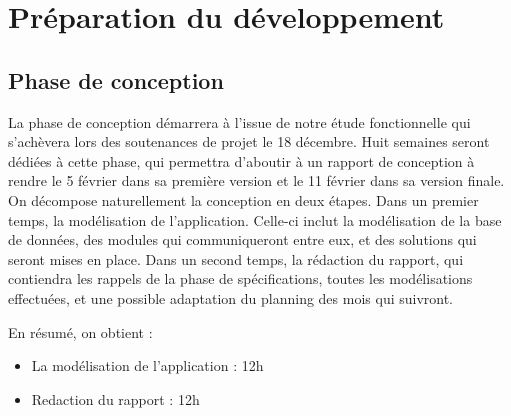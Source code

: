\section{Préparation du développement}
\label{sec:prep_dev}
    \subsection{Phase de conception}
    \label{subsec:conception}
        La phase de conception démarrera à l'issue de notre étude fonctionnelle qui s'achèvera lors des soutenances de projet le 18 décembre. Huit semaines seront dédiées à cette phase, qui permettra d'aboutir à un rapport de conception à rendre le 5 février dans sa première version et le 11 février dans sa version finale. On décompose naturellement la conception en deux étapes. Dans un premier temps, la modélisation de l'application. Celle-ci inclut la modélisation de la base de données, des modules qui communiqueront entre eux, et des solutions qui seront mises en place. Dans un second temps, la rédaction du rapport, qui contiendra les rappels de la phase de spécifications, toutes les modélisations effectuées, et une possible adaptation du planning des mois qui suivront.

        En résumé, on obtient :
        \begin{itemize}
            \item La modélisation de l'application : 12h
            \item Redaction du rapport : 12h
        \end{itemize}

